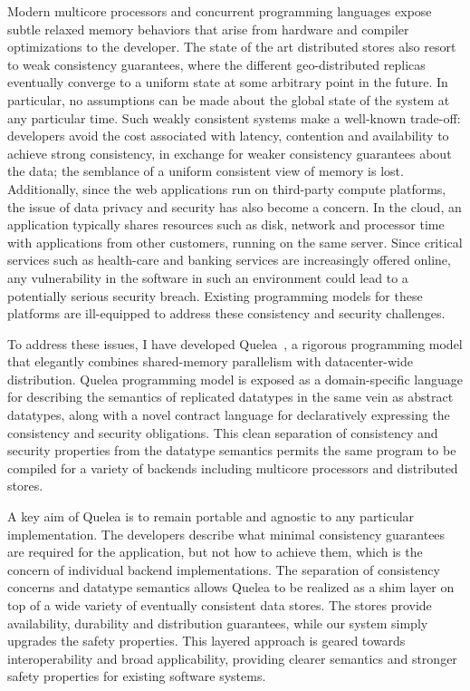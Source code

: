 \documentclass{article}
\begin{document}
Modern multicore processors and concurrent programming languages expose subtle
relaxed memory behaviors that arise from hardware and compiler optimizations
to the developer. The state of the art distributed stores also resort to weak
consistency guarantees, where the different geo-distributed replicas eventually
converge to a uniform state at some arbitrary point in the future. In
particular, no assumptions can be made about the global state of the system at
any particular time. Such weakly consistent systems make a well-known
trade-off: developers avoid the cost associated with latency, contention and
availability to achieve strong consistency, in exchange for weaker consistency
guarantees about the data; the semblance of a uniform consistent view of memory
is lost. Additionally, since the web applications run on third-party compute
platforms, the issue of data privacy and security has also become a concern. In
the cloud, an application typically shares resources such as disk, network and
processor time with applications from other customers, running on the same
server. Since critical services such as health-care and banking services are
increasingly offered online, any vulnerability in the software in such an
environment could lead to a potentially serious security breach. Existing
programming models for these platforms are ill-equipped to address these
consistency and security challenges.

To address these issues, I have developed Quelea~\cite{quelea}, a rigorous
programming model that elegantly combines shared-memory parallelism with
datacenter-wide distribution. Quelea programming model is exposed as a
domain-specific language for describing the semantics of replicated datatypes
in the same vein as abstract datatypes, along with a novel contract language
for declaratively expressing the consistency and security obligations. This
clean separation of consistency and security properties from the datatype
semantics permits the same program to be compiled for a variety of backends
including multicore processors and distributed stores.

A key aim of Quelea is to remain portable and agnostic to any particular
implementation. The developers describe what minimal consistency guarantees are
required for the application, but not how to achieve them, which is the concern
of individual backend implementations. The separation of consistency concerns
and datatype semantics allows Quelea to be realized as a shim layer on top of a
wide variety of eventually consistent data stores. The stores provide
availability, durability and distribution guarantees, while our system simply
upgrades the safety properties. This layered approach is geared towards
interoperability and broad applicability, providing clearer semantics and
stronger safety properties for existing software systems.
\end{document}
